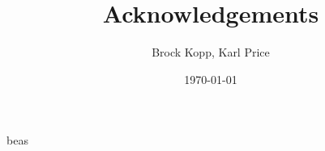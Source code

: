 \documentclass[letterpaper, 11pt, titlepage]{article}
\title{Acknowledgements}
\author{Brock Kopp, Karl Price}
\date{\today}
\begin{document}
\maketitle

\tableofcontents


%
%

%

%
%
%
%
%

beas
\end{document}
